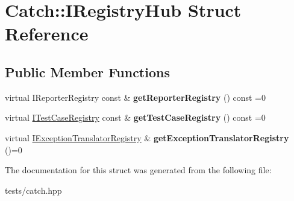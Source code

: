 \hypertarget{struct_catch_1_1_i_registry_hub}{}\section{Catch\+:\+:I\+Registry\+Hub Struct Reference}
\label{struct_catch_1_1_i_registry_hub}
\subsection*{Public Member Functions}
\begin{DoxyCompactItemize}
\item 
\mbox{\label{struct_catch_1_1_i_registry_hub_a55534563f7ecf7e20ec1e37285ebe54d}} 
virtual I\+Reporter\+Registry const  \& {\bfseries get\+Reporter\+Registry} () const =0
\item 
\mbox{\label{struct_catch_1_1_i_registry_hub_af4f6255f0c0f8f1f179fa9d7d4843076}} 
virtual \hyperlink{struct_catch_1_1_i_test_case_registry}{I\+Test\+Case\+Registry} const  \& {\bfseries get\+Test\+Case\+Registry} () const =0
\item 
\mbox{\label{struct_catch_1_1_i_registry_hub_a3606988da110c016c5af3ae63454eb78}} 
virtual \hyperlink{struct_catch_1_1_i_exception_translator_registry}{I\+Exception\+Translator\+Registry} \& {\bfseries get\+Exception\+Translator\+Registry} ()=0
\end{DoxyCompactItemize}


The documentation for this struct was generated from the following file\+:\begin{DoxyCompactItemize}
\item 
tests/catch.\+hpp\end{DoxyCompactItemize}

